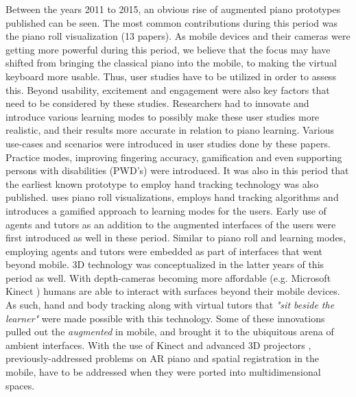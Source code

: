 \documentclass[sigconf, screen, review]{acmart}
\begin{document}
Between the years 2011 to 2015, an obvious rise of augmented piano prototypes published can be seen. The most common contributions during this period was the piano roll visualization (13 papers). As mobile devices and their cameras were getting more powerful during this period, we believe that the focus may have shifted from bringing the classical piano into the mobile, to making the virtual keyboard more usable. Thus, user studies have to be utilized in order to assess this. Beyond usability, excitement and engagement were also key factors that need to be considered by these studies. Researchers had to innovate and introduce various learning modes to possibly make these user studies more realistic, and their results more accurate in relation to piano learning. Various use-cases and scenarios were introduced in user studies done by these papers. Practice modes, improving fingering accuracy, gamification and even supporting persons with disabilities (PWD's) were introduced. It was also in this period that the earliest known prototype to employ hand tracking \cite{huang2011piano} technology was also published. \citet{weing2013piano} uses piano roll visualizations, employs hand tracking algorithms and introduces a gamified approach to learning modes for the users. Early use of agents and tutors as an addition to the augmented interfaces of the users were first introduced as well in these period. Similar to piano roll and learning modes, employing agents and tutors were embedded as part of interfaces that went beyond mobile. 3D technology was conceptualized in the latter years of this period as well. With depth-cameras becoming more affordable (e.g. Microsoft Kinect \cite{zhang2012microsoft}) humans are able to interact with surfaces beyond their mobile devices. As such, hand and body tracking along with virtual tutors that \textit{"sit beside the learner"} were made possible with this technology. Some of these innovations pulled out the \textit{augmented} in mobile, and brought it to the ubiquitous arena of ambient interfaces. With the use of Kinect and advanced 3D projectors \cite{yang2012augmented}, previously-addressed problems on AR piano and spatial registration in the mobile, have to be addressed when they were ported into multidimensional spaces. 
\end{document}
